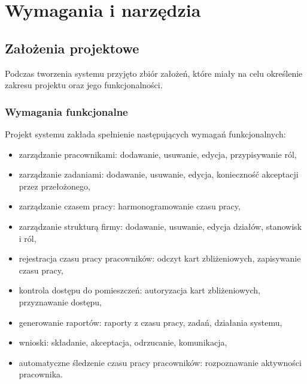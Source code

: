 \chapter{Wymagania i narzędzia}
\label{ch:wymagania-i-narzedzia}


\section{Założenia projektowe}


Podczas tworzenia systemu przyjęto zbiór założeń, które miały na celu określenie zakresu projektu oraz jego funkcjonalności.

\subsection{Wymagania funkcjonalne}

Projekt systemu zakłada spełnienie następujących wymagań funkcjonalnych:

\begin{itemize}
    \item zarządzanie pracownikami: dodawanie, usuwanie, edycja, przypisywanie ról,
    \item zarządzanie zadaniami: dodawanie, usuwanie, edycja, konieczność akceptacji przez przełożonego,
    \item zarządzanie czasem pracy: harmonogramowanie czasu pracy,
    \item zarządzanie strukturą firmy: dodawanie, usuwanie, edycja działów, stanowisk i ról,
    \item rejestracja czasu pracy pracowników: odczyt kart zbliżeniowych, zapisywanie czasu pracy,
    \item kontrola dostępu do pomieszczeń: autoryzacja kart zbliżeniowych, przyznawanie dostępu,
    \item generowanie raportów: raporty z czasu pracy, zadań, działania systemu,
    \item wnioski: składanie, akceptacja, odrzucanie, komunikacja,
    \item automatyczne śledzenie czasu pracy pracowników: rozpoznawanie aktywności pracownika.
\end{itemize}

